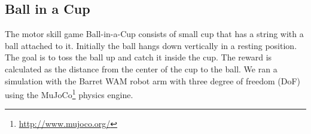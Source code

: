

\subsection{Ball in a Cup}
The motor skill game Ball-in-a-Cup consists
of small cup that has a string with a ball attached to it.
Initially the ball hangs down vertically in a resting position.
The goal is to toss the ball up and catch it inside the cup.
The reward is calculated as the distance from the center of the cup
to the ball. 
We ran a simulation with the Barret WAM robot arm with three
degree of freedom (DoF) using the
MuJoCo\footnote{\href{http://www.mujoco.org/}{http://www.mujoco.org/}}
physics engine.
